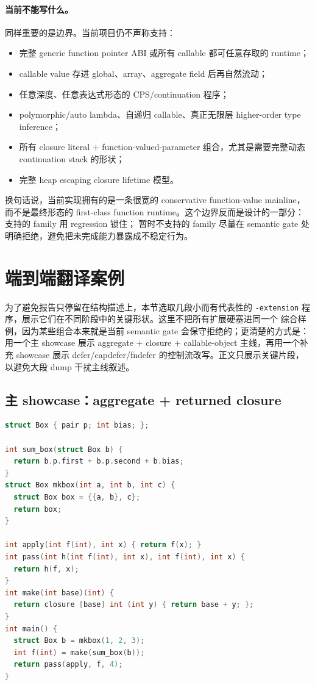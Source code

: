 \documentclass[UTF8,a4paper,11pt]{ctexart}
\begin{document}
\paragraph{当前不能写什么。}
同样重要的是边界。当前项目仍不声称支持：

\begin{itemize}
  \item 完整 generic function pointer ABI 或所有 callable 都可任意存取的 runtime；
  \item callable value 存进 global、array、aggregate field 后再自然流动；
  \item 任意深度、任意表达式形态的 CPS/continuation 程序；
  \item polymorphic/auto lambda、自递归 callable、真正无限层 higher-order type inference；
  \item 所有 closure literal + function-valued-parameter 组合，尤其是需要完整动态 continuation stack 的形状；
  \item 完整 heap escaping closure lifetime 模型。
\end{itemize}

换句话说，当前实现拥有的是一条很宽的 conservative function-value mainline，而不是最终形态的
first-class function runtime。这个边界反而是设计的一部分：支持的 family 用 regression 锁住；
暂时不支持的 family 尽量在 semantic gate 处明确拒绝，避免把未完成能力暴露成不稳定行为。

\section{端到端翻译案例}

为了避免报告只停留在结构描述上，本节选取几段小而有代表性的
\texttt{-extension} 程序，展示它们在不同阶段中的关键形状。这里不把所有扩展硬塞进同一个
综合样例，因为某些组合本来就是当前 semantic gate 会保守拒绝的；更清楚的方式是：
用一个主 showcase 展示 aggregate + closure + callable-object 主线，再用一个补充 showcase 展示
defer/capdefer/fndefer 的控制流改写。正文只展示关键片段，以避免大段 dump 干扰主线叙述。

\subsection{主 showcase：aggregate + returned closure}

\begin{lstlisting}[language=C]
struct Box { pair p; int bias; };

int sum_box(struct Box b) {
  return b.p.first + b.p.second + b.bias;
}
struct Box mkbox(int a, int b, int c) {
  struct Box box = {{a, b}, c};
  return box;
}

int apply(int f(int), int x) { return f(x); }
int pass(int h(int f(int), int x), int f(int), int x) {
  return h(f, x);
}
int make(int base)(int) {
  return closure [base] int (int y) { return base + y; };
}
int main() {
  struct Box b = mkbox(1, 2, 3);
  int f(int) = make(sum_box(b));
  return pass(apply, f, 4);
}
\end{lstlisting}
\end{document}
